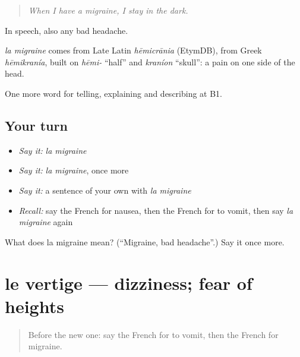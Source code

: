 \begin{quote}
\emph{When I have a migraine, I stay in the dark.}
\end{quote}

In speech, also any bad headache.

\begin{cousinweb}
\emph{la migraine} comes from Late Latin \emph{hēmicrānia} (EtymDB), from Greek \emph{hēmikranía}, built on \emph{hēmi-} \textquotedblleft{}half\textquotedblright{} and \emph{kraníon} \textquotedblleft{}skull\textquotedblright{}: a pain on one side of the head.
\end{cousinweb}

\begin{grammarlens}[title={What you've built}]
One more word for telling, explaining and describing at B1.
\end{grammarlens}

\subsection*{Your turn}
\begin{itemize}
\raggedright
  \item \emph{Say it:} \emph{la migraine}
  \item \emph{Say it:} \emph{la migraine}, once more
  \item \emph{Say it:} a sentence of your own with \emph{la migraine}
  \item \emph{Recall:} say the French for nausea, then the French for to vomit, then say \emph{la migraine} again
\end{itemize}

\begin{tcolorbox}[breakable,colback=teal!4,colframe=teal!35!black,title={Before you move on}]
What does la migraine mean? (\textquotedblleft{}Migraine, bad headache\textquotedblright{}.) Say it once more.
\end{tcolorbox}
\section[le vertige]{le vertige — dizziness; fear of heights}

\label{lesson:FR-C483-vertige}



\begin{quote}
Before the new one: say the French for to vomit, then the French for migraine.
\end{quote}

